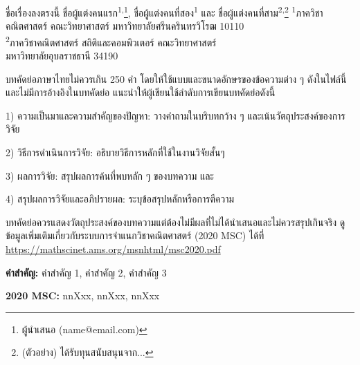 \documentclass[12pt, a4paper]{article}
\newenvironment{AMM-abstractTH}[4][]{
  \begin{center}
    { \renewcommand\textsuperscript[1]{}\par}
    {{\Large\bfseries #2}\par}
    \medskip
    {\large #3\par}
    \bigskip
    {\small #4\par}
    \bigskip\bigskip
    {{\large\bfseries บทคัดย่อ}\par}
  \end{center}
}{ 
    \bigskip
    \hrule
    \bigskip
}
\newcommand{\mykeywordsTH}[1]{%
    \noindent \textbf{คำสำคัญ:} #1 \par
}
\newcommand{\myMSC}[1]{
    \noindent \textbf{2020 MSC:} #1 \par
}
\begin{document}
%
%

\begin{AMM-abstractTH}[]
{ชื่อเรื่องลงตรงนี้} %
{ชื่อผู้แต่งคนแรก\textsuperscript{1,}\footnote{ผู้นำเสนอ (name@email.com)}, ชื่อผู้แต่งคนที่สอง\textsuperscript{1}
และ ชื่อผู้แต่งคนที่สาม\textsuperscript{2,}\footnote{(ตัวอย่าง) ได้รับทุนสนับสนุนจาก...}} %
{\textsuperscript{1}ภาควิชาคณิตศาสตร์ คณะวิทยาศาสตร์
มหาวิทยาลัยศรีนครินทรวิโรฒ 10110\\ \smallskip
\textsuperscript{2}ภาควิชาคณิตศาสตร์ สถิติและคอมพิวเตอร์ คณะวิทยาศาสตร์ \\ มหาวิทยาลัยอุบลราชธานี 34190} %

บทคัดย่อภาษาไทยไม่ควรเกิน 250 คำ 
โดยให้ใช้แบบและขนาดอักษรของข้อความต่าง ๆ ดังในไฟล์นี้ 
และไม่มีการอ้างอิงในบทคัดย่อ แนะนำให้ผู้เขียนใช้ลำดับการเขียนบทคัดย่อดังนี้  

1) ความเป็นมาและความสำคัญของปัญหา: วางคำถามในบริบทกว้าง ๆ และเน้นวัตถุประสงค์ของการวิจัย 

2) วิธีการดำเนินการวิจัย: อธิบายวิธีการหลักที่ใช้ในงานวิจัยสั้นๆ 

3) ผลการวิจัย: สรุปผลการค้นที่พบหลัก ๆ ของบทความ และ 

4) สรุปผลการวิจัยและอภิปรายผล: ระบุข้อสรุปหลักหรือการตีความ 

บทคัดย่อควรแสดงวัตถุประสงค์ของบทความแต่ต้องไม่มีผลที่ไม่ได้นำเสนอและไม่ควรสรุปเกินจริง
ดูข้อมูลเพิ่มเติมเกี่ยวกับระบบการจำแนกวิชาคณิตศาสตร์ (2020 MSC) ได้ที่ \url{https://mathscinet.ams.org/msnhtml/msc2020.pdf}
\end{AMM-abstractTH}


\mykeywordsTH{คำสำคัญ 1, คำสำคัญ 2, คำสำคัญ 3} %
\smallskip
\myMSC{nnXxx, nnXxx, nnXxx} %
\end{document}
